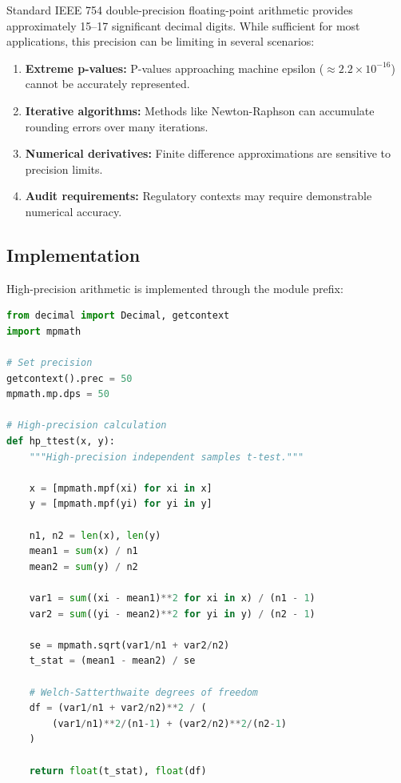 \documentclass[article]{jss}
\begin{document}
Standard IEEE 754 double-precision floating-point arithmetic provides approximately 15--17 significant decimal digits. While sufficient for most applications, this precision can be limiting in several scenarios:

\begin{enumerate}
\item \textbf{Extreme p-values:} P-values approaching machine epsilon ($\approx 2.2 \times 10^{-16}$) cannot be accurately represented.
\item \textbf{Iterative algorithms:} Methods like Newton-Raphson can accumulate rounding errors over many iterations.
\item \textbf{Numerical derivatives:} Finite difference approximations are sensitive to precision limits.
\item \textbf{Audit requirements:} Regulatory contexts may require demonstrable numerical accuracy.
\end{enumerate}

\subsection{Implementation}

High-precision arithmetic is implemented through the  module prefix:

\begin{lstlisting}[language=Python,caption={High-precision t-test}]
from decimal import Decimal, getcontext
import mpmath

# Set precision
getcontext().prec = 50
mpmath.mp.dps = 50

# High-precision calculation
def hp_ttest(x, y):
    """High-precision independent samples t-test."""

    x = [mpmath.mpf(xi) for xi in x]
    y = [mpmath.mpf(yi) for yi in y]

    n1, n2 = len(x), len(y)
    mean1 = sum(x) / n1
    mean2 = sum(y) / n2

    var1 = sum((xi - mean1)**2 for xi in x) / (n1 - 1)
    var2 = sum((yi - mean2)**2 for yi in y) / (n2 - 1)

    se = mpmath.sqrt(var1/n1 + var2/n2)
    t_stat = (mean1 - mean2) / se

    # Welch-Satterthwaite degrees of freedom
    df = (var1/n1 + var2/n2)**2 / (
        (var1/n1)**2/(n1-1) + (var2/n2)**2/(n2-1)
    )

    return float(t_stat), float(df)
\end{lstlisting}
\end{document}
